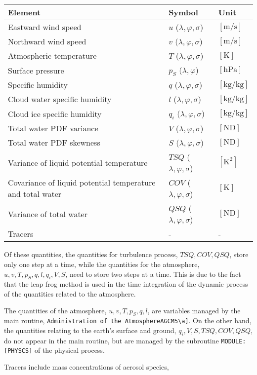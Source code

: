 \begin{longtable}[]{@{}lll@{}}
\toprule
Element & Symbol & Unit \\
\midrule
\endhead
Eastward wind speed & \(u\) (\(\lambda,\varphi,\sigma\)) & \(\mathrm{[m/s]}\) \\
Northward wind speed & \(v\) (\(\lambda,\varphi,\sigma\)) & \(\mathrm{[m/s]}\) \\
Atmospheric temperature & \(T\) (\(\lambda,\varphi,\sigma\)) & \(\mathrm{[K]}\) \\
Surface pressure & \(p_S\) (\(\lambda,\varphi\)) & \(\mathrm{[hPa]}\) \\
Specific humidity & \(q\) (\(\lambda,\varphi,\sigma\)) & \(\mathrm{[kg/kg]}\) \\
Cloud water specific humidity & \(l\) (\(\lambda,\varphi,\sigma\)) & \(\mathrm{[kg/kg]}\) \\
Cloud ice specific humidity & \(q_i\) (\(\lambda,\varphi,\sigma\)) & \(\mathrm{[kg/kg]}\) \\
Total water PDF variance & \(V\) (\(\lambda,\varphi,\sigma\)) & \(\mathrm{[ND]}\) \\
Total water PDF skewness & \(S\) (\(\lambda,\varphi,\sigma\)) & \(\mathrm{[ND]}\) \\
Variance of liquid potential temperature & \(TSQ\) (\(\lambda,\varphi,\sigma\)) & \(\mathrm{[K^2]}\) \\
Covariance of liquid potential temperature and total water & \(COV\) (\(\lambda,\varphi,\sigma\)) & \(\mathrm{[K]}\) \\
Variance of total water & \(QSQ\) (\(\lambda,\varphi,\sigma\)) & \(\mathrm{[ND]}\) \\
Tracers & - & - \\
\bottomrule
\end{longtable}

Of these quantities, the quantities for turbulence process, \(TSQ, COV, QSQ\), store only one step at a time, while the quantities for the atmosphere, \(u, v, T, p_S, q, l, q_i, V, S\), need to store
two steps at a time. This is due to the fact that the leap frog method is used in the time integration of the dynamic process of the quantities related to the atmosphere.

The quantities of the atmosphere, \(u, v, T, p_S, q, l\), are variables managed by the main routine, \texttt{Administration\ of\ the\ Atmosphere\textquotesingle{}{[}AGCM5\textbackslash{}a{]}}. On the
other hand, the quantities relating to the earth's surface and ground, \(q_i, V, S, TSQ, COV, QSQ\), do not appear in the main routine, but are managed by the subroutine \texttt{MODULE:{[}PHYSCS{]}}
of the physical process.

Tracers include mass concentrations of aerosol species,
